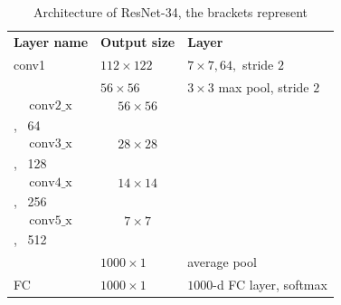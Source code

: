 \begin{table}
    \centering
    \begingroup
    
    \begin{tabular}{>{\centering\arraybackslash}p{}|>{\centering\arraybackslash}p{}|>{\centering\arraybackslash}p{}}


        \hline
        \multicolumn{3}{c}{\textbf{ResNet-34 architecture}}\\
        \hline
        \textbf{Layer name} & \textbf{Output size} & \textbf{Layer} \\
        \hline
        \hline
        conv1 & $112 \times 122$ & $7 \times 7, 64,$ stride $2$ \\
        \hline
          & $56 \times 56$ & $3 \times 3$ max pool, stride $2$ \\
        \hline

        \[ \textrm{conv2\char`_x} \] &  \[56 \times 56 \] & \[\left[ \begin{array}{c} 3 \times 3, \, 64\\ 3 \times 3, \, 64  \end{array}\right] \times 3 \]\\
        \hline

        \[ \textrm{conv3\char`_x} \] &  \[28 \times 28 \] & \[\left[ \begin{array}{c} 3 \times 3, \, 128\\ 3 \times 3, \, 128  \end{array}\right] \times 4 \]\\
        \hline

        \[ \textrm{conv4\char`_x} \] &  \[14 \times 14 \] & \[\left[ \begin{array}{c} 3 \times 3, \, 256\\ 3 \times 3, \, 256  \end{array}\right] \times 6 \]\\
        \hline

        \[ \textrm{conv5\char`_x} \] &  \[7 \times 7 \] & \[\left[ \begin{array}{c} 3 \times 3, \, 512\\ 3 \times 3, \, 512  \end{array}\right] \times 3 \]\\
        \hline
        & $1000 \times 1$ & average pool \\
        \hline
        FC & $1000 \times 1$ & $1000$-d FC layer, softmax \\
        \hline
        \end{tabular}
    \endgroup
    \caption{Architecture of ResNet-34, the brackets represent}
    \label{table:resnet}
\end{table}

